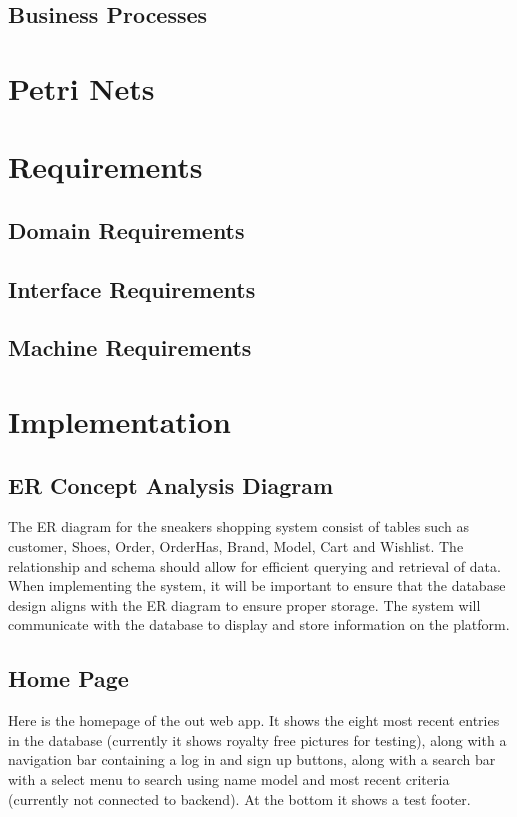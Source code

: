 \subsection{Business Processes}
\section{Petri Nets}
\section{Requirements}
\subsection{Domain Requirements}
\subsection{Interface Requirements}
\subsection{Machine Requirements}
\section{Implementation}
\subsection{ER Concept Analysis Diagram}
\hspace{1cm} The ER diagram for the sneakers shopping system consist of tables such as customer, Shoes, Order,
OrderHas, Brand, Model, Cart and Wishlist. The relationship and schema should allow for efficient
querying and retrieval of data. When implementing the system, it will be important to ensure that the
database design aligns with the ER diagram to ensure proper storage. The system will communicate with
the database to display and store information on the platform.
\subsection{Home Page}
Here is the homepage of the out web app. It shows the eight most recent entries in the database (currently it shows royalty free pictures for testing), along with a navigation bar containing a log in and sign up buttons, along with a search bar with a select menu to search using name model and most recent criteria (currently not connected to backend). At the bottom it shows a test footer.
